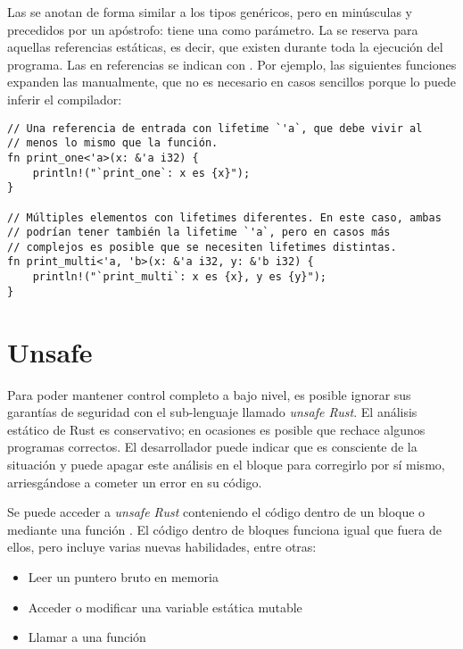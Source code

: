 Las \lifetimes se anotan de forma similar a los tipos genéricos, pero en
minúsculas y precedidos por un apóstrofo:  tiene una \lifetime
{} como parámetro. La \lifetime {} se reserva para aquellas
referencias estáticas, es decir, que existen durante toda la ejecución del
programa. Las \lifetimes en referencias se indican con . Por
ejemplo, las siguientes funciones expanden las \lifetimes manualmente, que no es
necesario en casos sencillos porque lo puede inferir el compilador:

\begin{verbatim}
// Una referencia de entrada con lifetime `'a`, que debe vivir al
// menos lo mismo que la función.
fn print_one<'a>(x: &'a i32) {
    println!("`print_one`: x es {x}");
}

// Múltiples elementos con lifetimes diferentes. En este caso, ambas
// podrían tener también la lifetime `'a`, pero en casos más
// complejos es posible que se necesiten lifetimes distintas.
fn print_multi<'a, 'b>(x: &'a i32, y: &'b i32) {
    println!("`print_multi`: x es {x}, y es {y}");
}
\end{verbatim}

\section{Unsafe}

Para poder mantener control completo a bajo nivel, es posible ignorar sus
garantías de seguridad con el sub-lenguaje llamado \emph{unsafe Rust}. El
análisis estático de Rust es conservativo; en ocasiones es posible que rechace
algunos programas correctos. El desarrollador puede indicar que es consciente de
la situación y puede apagar este análisis en el bloque para corregirlo por sí
mismo, arriesgándose a cometer un error en su código.

Se puede acceder a \emph{unsafe Rust} conteniendo el código dentro de un bloque
 o mediante una función . El código dentro de bloques  funciona igual que fuera de
ellos, pero incluye varias nuevas habilidades, entre otras:

\begin{itemize}
    \item Leer un puntero bruto en memoria

    \item Acceder o modificar una variable estática mutable

    \item Llamar a una función \unsafe

\end{itemize}

